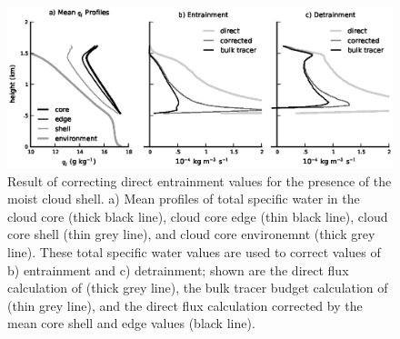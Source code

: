 \documentclass[draft,grl]{agutex}
\begin{document}



\begin{figure}
  \noindent\includegraphics[width=39pc]{./figures/shell_correction}
  \caption{Result of correcting direct entrainment values for the presence of 
  the moist cloud shell.  a) Mean profiles of total specific water in the 
  cloud core (thick black line), cloud core edge (thin black line), cloud core 
  shell (thin grey line), and cloud core environemnt (thick grey line).  These 
  total specific water values are used to correct values of b) entrainment and 
  c) detrainment; shown are the direct flux calculation of \cite{Romps2010}
  (thick grey line), the bulk tracer budget calculation of \cite{Siebesma1995} 
  (thin grey line), and the direct flux calculation corrected by the mean 
  core shell and edge values (black line).
  }
  \label{fig:shell_correction}
\end{figure}
\end{document}
